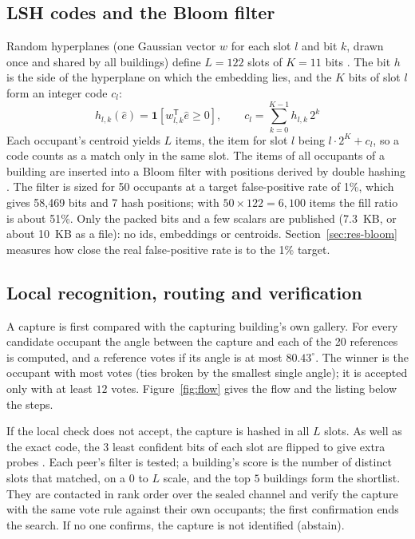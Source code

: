 \documentclass[12pt,a4paper,oneside]{report}
\begin{document}
\subsection{LSH codes and the Bloom filter}
Random hyperplanes (one Gaussian vector $w$ for each slot $l$ and bit $k$, drawn once and shared by all buildings) define $L=122$ slots of $K=11$ bits \cite{ref14}. The bit $h$ is the side of the hyperplane on which the embedding lies, and the $K$ bits of slot $l$ form an integer code $c_l$:
\begin{equation}
h_{l,k}(\hat{e})=\mathbf{1}\!\left[w_{l,k}^{\mathsf{T}}\hat{e}\geq 0\right],\qquad c_l=\sum_{k=0}^{K-1}h_{l,k}\,2^{k}
\end{equation}
Each occupant's centroid yields $L$ items, the item for slot $l$ being $l\cdot 2^{K}+c_l$, so a code counts as a match only in the same slot. The items of all occupants of a building are inserted into a Bloom filter \cite{ref12} with positions derived by double hashing \cite{ref16}. The filter is sized for 50 occupants at a target false-positive rate of 1\%, which gives 58,469 bits and 7 hash positions; with $50\times 122=6{,}100$ items the fill ratio is about 51\%. Only the packed bits and a few scalars are published (7.3~KB, or about 10~KB as a file): no ids, embeddings or centroids. Section~\ref{sec:res-bloom} measures how close the real false-positive rate is to the 1\% target.

\subsection{Local recognition, routing and verification}
A capture is first compared with the capturing building's own gallery. For every candidate occupant the angle between the capture and each of the 20 references is computed, and a reference votes if its angle is at most $80.43^{\circ}$. The winner is the occupant with most votes (ties broken by the smallest single angle); it is accepted only with at least $12$ votes. Figure~\ref{fig:flow} gives the flow and the listing below the steps.

If the local check does not accept, the capture is hashed in all $L$ slots. As well as the exact code, the $3$ least confident bits of each slot are flipped to give extra probes \cite{ref15}. Each peer's filter is tested; a building's score is the number of distinct slots that matched, on a 0 to $L$ scale, and the top $5$ buildings form the shortlist. They are contacted in rank order over the sealed channel and verify the capture with the same vote rule against their own occupants; the first confirmation ends the search. If no one confirms, the capture is not identified (abstain).
\end{document}
